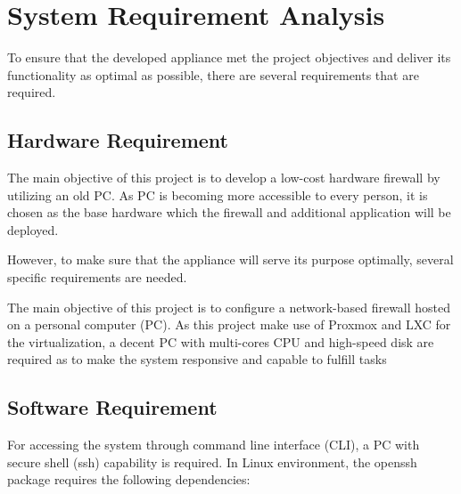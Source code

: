\documentclass[../index.tex]{subfiles}
\begin{document}
\section{System Requirement Analysis}

To ensure that the developed appliance met the project objectives and deliver
its functionality as optimal as possible, there are several requirements that are required.

\subsection{Hardware Requirement}

The main objective of this project is to develop a low-cost hardware firewall
by utilizing an old PC. As PC is becoming more accessible to every person, it is chosen
as the base hardware which the firewall and additional application will be deployed.

However, to make sure that the appliance will serve its purpose optimally, several specific
requirements are needed.

The main objective of this project is to configure a network-based firewall
hosted on a personal computer (PC). As this project make use of Proxmox and LXC
for the virtualization, a decent PC with multi-cores CPU and high-speed disk are
required as to make the system responsive and capable to fulfill tasks

\subsection{Software Requirement}

For accessing the system through command line interface (CLI), a PC with
secure shell (ssh) capability is required. In Linux environment, the openssh package
requires the following dependencies:
\end{document}
